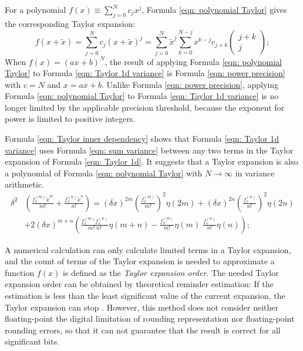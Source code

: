 \documentclass[twoside]{article}
\numberwithin{equation}{section}
\begin{document}
For a polynomial $f(x) \equiv \sum_{j=0}^{N} c_j x^j$, Formula \eqref{eqn: polynomial Taylor} gives the corresponding Taylor expansion:
\begin{equation}
\label{eqn: polynomial Taylor}
f(x + \tilde{x}) = \sum_{j=0}^{N} c_j (x + \tilde{x})^j = \sum_{j=0}^{N} \tilde{x}^{j} \sum_{k=0}^{N-j} x^{k - j} c_{j + k} \begin{pmatrix} j + k \\ j \end{pmatrix};
\end{equation}
When $f(x) = (ax + b)^N$, the result of applying Formula \eqref{eqn: polynomial Taylor} to Formula \eqref{eqn: Taylor 1d variance} is Formula \eqref{eqn: power precision} with $c=N$ and $x = ax + b$. 
Unlike Formula \eqref{eqn: power precision}, applying Formula \eqref{eqn: polynomial Taylor} to Formula \eqref{eqn: Taylor 1d variance} is no longer limited by the applicable precision threshold, because the exponent for power is limited to positive integers.

Formula \eqref{eqn: Taylor inner dependency} shows that Formula \eqref{eqn: Taylor 1d variance} uses Formula \eqref{eqn: sum variance} between any two terms in the Taylor expansion of Formula \eqref{eqn: Taylor 1d}.
It suggests that a Taylor expansion is also a polynomial of Formula \eqref{eqn: polynomial Taylor} with $N \rightarrow \infty$ in variance arithmetic.
\begin{align}
\label{eqn: Taylor inner dependency}
\delta^2 & \left( \frac{f^{(m)}_x \tilde{x}^m}{m!} + \frac{f^{(n)}_x \tilde{x}^n}{n!} \right) = 
    (\delta x)^{2m} (\frac{f^{(m)}_x }{m!})^2 \eta(2m) + (\delta x)^{2n} (\frac{f^{(n)}_x }{n!})^2 \eta(2n) \\
  &+ 2 (\delta x)^{m+n} \left( \frac{f^{(m)}_x f^{(n)}_x}{m! \;n!} \eta(m+n) 	- \frac{f^{(m)}_x}{m!} \eta(m) \;\frac{f^{(n)}_x}{n!}  \eta(n) \right);  \nonumber
\end{align}

A numerical calculation can only calculate limited terms in a Taylor expansion, and the count of terms of the Taylor expansion is needed to approximate a function $f(x)$ is defined as the \emph{Taylor expansion order}.
The needed Taylor expansion order can be obtained by theoretical reminder estimation: If the estimation is less than the least significant value of the current expansion, the Taylor expansion can stop \cite{Numerical_Recipes}.
However, this method does not consider neither floating-point the digital limitation of rounding representation nor floating-point rounding errors, so that it can not guarantee that the result is correct for all significant bits.
\end{document}
